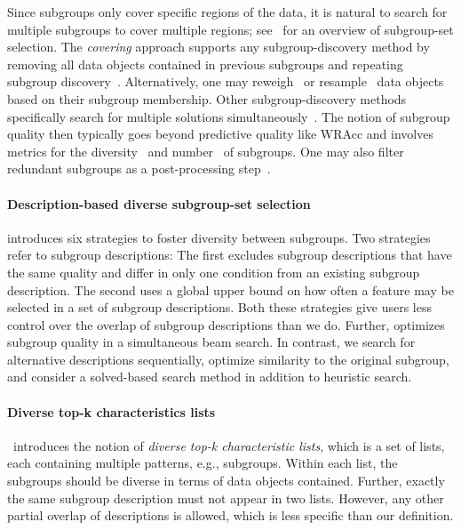Since subgroups only cover specific regions of the data, it is natural to search for multiple subgroups to cover multiple regions; see~\cite{atzmueller2015subgroup} for an overview of subgroup-set selection.
The \emph{covering} approach supports any subgroup-discovery method by removing all data objects contained in previous subgroups and repeating subgroup discovery~\cite{friedman1999bump}.
Alternatively, one may reweigh~\cite{gamberger2002expert, lavrac2004subgroup} or resample~\cite{scholz2005sampling} data objects based on their subgroup membership.
Other subgroup-discovery methods specifically search for multiple solutions simultaneously~\cite{leeuwen2012diverse, leeuwen2013discovering, lemmerich2010fast, lucas2018ssdp+, proencca2022robust}.
The notion of subgroup quality then typically goes beyond predictive quality like WRAcc and involves metrics for the diversity~\cite{belfodil2019fssd, leeuwen2012diverse, leeuwen2013discovering, lucas2018ssdp+} and number~\cite{helal2016subgroup, herrera2011overview, ventura2018subgroup} of subgroups.
One may also filter redundant subgroups as a post-processing step~\cite{bosc2018anytime, grosskreutz2012enhanced, hudson2023subgroup, leeuwen2013discovering}.

\paragraph{Description-based diverse subgroup-set selection}

\cite{leeuwen2012diverse} introduces six strategies to foster diversity between subgroups.
Two strategies refer to subgroup descriptions:
The first excludes subgroup descriptions that have the same quality and differ in only one condition from an existing subgroup description.
The second uses a global upper bound on how often a feature may be selected in a set of subgroup descriptions.
Both these strategies give users less control over the overlap of subgroup descriptions than we do.
Further, \cite{leeuwen2012diverse} optimizes subgroup quality in a simultaneous beam search.
In contrast, we search for alternative descriptions sequentially, optimize similarity to the original subgroup, and consider a solved-based search method in addition to heuristic search.

\paragraph{Diverse top-k characteristics lists}

\cite{lopez2023discovering}~introduces the notion of \emph{diverse top-k characteristic lists}, which is a set of lists, each containing multiple patterns, e.g., subgroups.
Within each list, the subgroups should be diverse in terms of data objects contained.
Further, exactly the same subgroup description must not appear in two lists.
However, any other partial overlap of descriptions is allowed, which is less specific than our definition.

